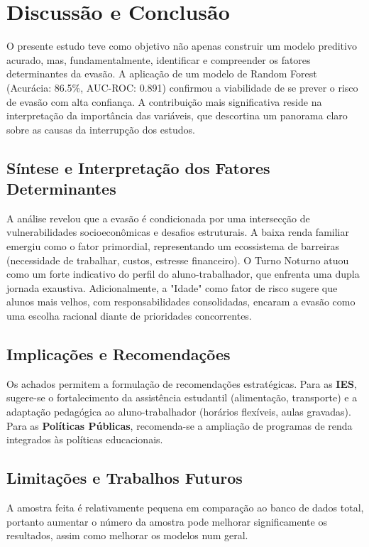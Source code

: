 \documentclass[brazilian, english, spanish]{RBIEarticle}
\begin{document}
\section{Discussão e Conclusão}
O presente estudo teve como objetivo não apenas construir um modelo preditivo acurado, mas, fundamentalmente, identificar e compreender os fatores determinantes da evasão. A aplicação de um modelo de Random Forest (Acurácia: 86.5\%, AUC-ROC: 0.891) confirmou a viabilidade de se prever o risco de evasão com alta confiança. A contribuição mais significativa reside na interpretação da importância das variáveis, que descortina um panorama claro sobre as causas da interrupção dos estudos.

\subsection{Síntese e Interpretação dos Fatores Determinantes}
A análise revelou que a evasão é condicionada por uma intersecção de vulnerabilidades socioeconômicas e desafios estruturais. A baixa renda familiar emergiu como o fator primordial, representando um ecossistema de barreiras (necessidade de trabalhar, custos, estresse financeiro). O Turno Noturno atuou como um forte indicativo do perfil do aluno-trabalhador, que enfrenta uma dupla jornada exaustiva. Adicionalmente, a "Idade" como fator de risco sugere que alunos mais velhos, com responsabilidades consolidadas, encaram a evasão como uma escolha racional diante de prioridades concorrentes.

\subsection{Implicações e Recomendações}
Os achados permitem a formulação de recomendações estratégicas. Para as \textbf{IES}, sugere-se o fortalecimento da assistência estudantil (alimentação, transporte) e a adaptação pedagógica ao aluno-trabalhador (horários flexíveis, aulas gravadas). Para as \textbf{Políticas Públicas}, recomenda-se a ampliação de programas de renda integrados às políticas educacionais.

\subsection{Limitações e Trabalhos Futuros}
A amostra feita é relativamente pequena em comparação ao banco de dados total, portanto aumentar o número da amostra pode melhorar significamente os resultados, assim como melhorar os modelos num geral.
\end{document}
